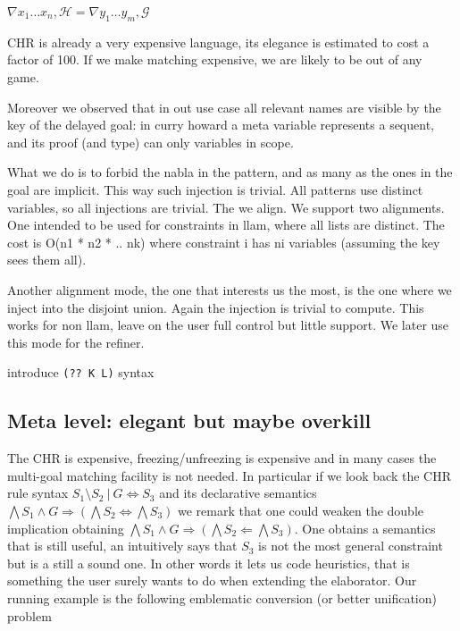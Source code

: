 \documentclass{easychair}
\begin{document}
\begin{math}
 \nabla x_1\ldots x_n, \mathcal{H} = \nabla y_1\ldots y_m, \mathcal{G}
\end{math}

CHR is already a very expensive language, its elegance is estimated
to cost a factor of 100.  If we make matching expensive, we are likely to
be out of any game.

Moreover we observed that in out use case all relevant names are
visible by the key of the delayed goal: in curry howard a meta variable
represents a sequent, and its proof (and type) can only variables in scope.

What we do is to forbid the nabla in the pattern, and as many as the
ones in the goal are implicit. This way such injection is trivial.
All patterns use distinct variables, so all injections are trivial.
The we align.  We support two alignments.  One intended to be used 
for constraints in llam, where all lists are distinct.  The cost is O(n1 * n2 * .. nk) where constraint i has ni variables (assuming the key sees them all).

Another alignment mode, the one that interests us the most, is the one where
we inject into the disjoint union.  Again the injection is trivial to compute.
This works for non llam, leave on the user full control but little support.
We later use this mode for the refiner.

introduce \verb+(?? K L)+ syntax

\subsection{Meta level: elegant but maybe overkill}

The CHR is expensive, freezing/unfreezing is expensive and in many cases
the multi-goal matching facility is not needed.  In particular
if we look back the CHR rule syntax
$S_1 \setminus S_2 ~|~ G \iff S_3$ and its
declarative semantics $\bigwedge S_1 \wedge G \Rightarrow (\bigwedge
S_2 \iff \bigwedge S_3)$ we remark that one could
weaken the double implication obtaining
 $\bigwedge S_1 \wedge G \Rightarrow (\bigwedge
S_2 \Leftarrow \bigwedge S_3)$.  One obtains a semantics that
is still useful, an intuitively says that $S_3$ is not the most general
constraint but is a still a sound one.  In other words it lets
us code heuristics, that is something the user surely wants to
do when extending the elaborator.  Our running example
is the following emblematic conversion (or better unification) problem
\end{document}
